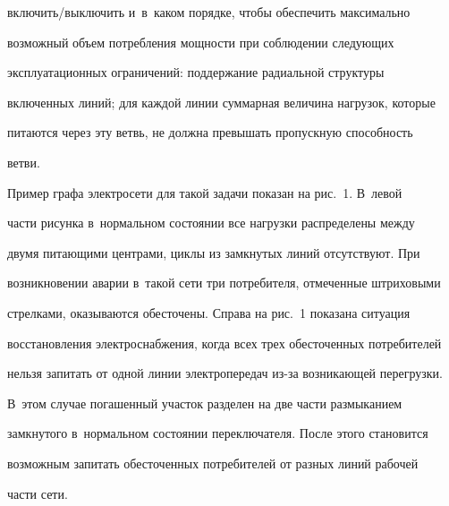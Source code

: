 вклю\-чить\!/\!вы\-клю\-чить и~в~каком порядке, чтобы обеспечить максимально 


возможный объем по\-треб\-ле\-ния мощ\-ности при соблюдении сле\-ду\-ющих 


эксплуатационных ограничений: поддержание радиальной структуры 


вклю\-чен\-ных линий; для каждой линии суммарная величина нагрузок, которые 


питаются через эту ветвь, не должна превышать пропускную спо\-соб\-ность 


ветви. 


  


  Пример графа электросети для такой задачи показан на рис.~1. В~левой 


части рисунка в~нормальном состоянии все нагрузки распределены между 


двумя питающими центрами, циклы из замкнутых линий отсутствуют. При 


возникновении аварии в~такой сети три потребителя, отмеченные штриховыми 


стрелками, оказываются обесточены. Справа на рис.~1 показана ситуация 


восстановления электроснабжения, когда всех трех обесточенных потребителей 


нельзя запитать от одной линии электропередач из-за возникающей перегрузки. 


В~этом случае погашенный участок разделен на две части размыканием 


замкнутого в~нормальном состоянии переключателя. После этого становится 


возможным запитать обесточенных потребителей от разных линий рабочей 


части сети. 


  


